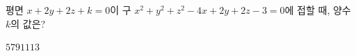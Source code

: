 평면 $x+2y+2z+k=0$이 구 $x^2+y^2+z^2-4x+2y+2z-3=0$에 접할 때, 양수 $k$의 값은?
\begin{choices32}{$5$}{$7$}{$9$}{$11$}{$13$}\end{choices32}
